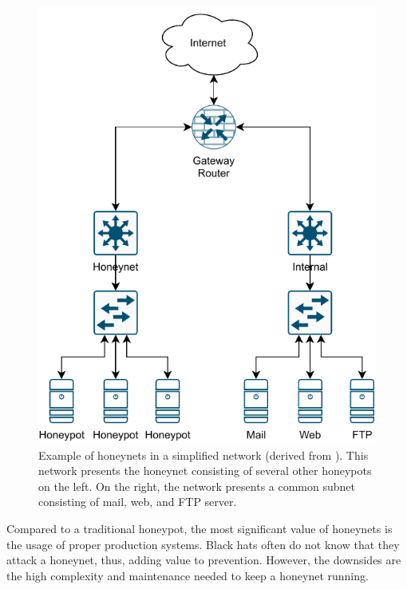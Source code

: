 \begin{figure}[ht]
    \centering
    \includegraphics{figures/honeynet-example.pdf}
    \caption[Example of honeynets in a simplified network]{
        Example of honeynets in a simplified network (derived from \cite{Spitzner2003}).
        This network presents the honeynet consisting of several other honeypots on the left.
        On the right, the network presents a common subnet consisting of mail, web, and FTP server.
    }
    \label{fig:honeynet-example}
\end{figure}

Compared to a traditional honeypot, the most significant value of honeynets is the usage of proper production systems.
Black hats often do not know that they attack a honeynet, thus, adding value to prevention.
However, the downsides are the high complexity and maintenance needed to keep a honeynet running. \cite{Spitzner2003}

